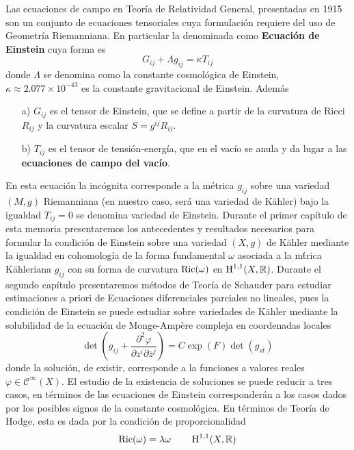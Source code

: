 Las ecuaciones de campo en Teor\'ia de Relatividad General, presentadas en 1915 son un conjunto de ecuaciones tensoriales cuya formulaci\'on requiere del uso de Geometr\'ia Riemanniana. En particular la denominada como \textbf{Ecuaci\'on de Einstein} cuya forma es
\[
	G_{ij} + \Lambda g_{ij} = \kappa T_{ij}
\]
donde $\Lambda$ se denomina como la constante cosmol\'ogica de Einstein, $\kappa \approx 2.077 \times 10^{-43}$ es la constante gravitacional de Einstein. Adem\'as
\begin{enumerate}
\item[a)] $G_{ij}$ es el tensor de Einstein, que se define a partir de la curvatura de Ricci $R_{ij}$ y la curvatura escalar $S = g^{ij}R_{ij}$.
\item[b)] $T_{ij}$ es el tensor de tensi\'on-energ\'ia, que en el vac\'io se anula y da lugar a las \textbf{ecuaciones de campo del vac\'io}.
\end{enumerate}
En esta ecuaci\'on la inc\'ognita corresponde a la m\'etrica $g_{ij}$ sobre una variedad $(M,g)$ Riemanniana (en nuestro caso, ser\'a una variedad de K\"ahler) bajo la igualdad $T_{ij}=0$ se denomina variedad de Einstein. Durante el primer cap\'itulo de esta memoria presentaremos los antecedentes y resultados necesarios para formular la condici\'on de Einstein sobre una variedad $(X,g)$ de K\"ahler mediante la igualdad en cohomolog\'ia de la forma fundamental $\omega$ asociada a la m\'trica K\"ahleriana $g_{ij}$ con su forma de curvatura $\operatorname{Ric} (\omega)$ en $\operatorname{H}^{1,1}(X, \mathbb{R})$. Durante el segundo cap\'itulo presentaremos m\'etodos de Teor\'ia de Schauder para estudiar estimaciones a priori de Ecuaciones diferenciales parciales no lineales, pues la condici\'on de Einstein se puede estudiar sobre variedades de K\"ahler mediante la solubilidad de la ecuaci\'on de Monge-Amp\`ere compleja en coordenadas locales
\begin{equation*}
\det \left( g_{ij} + \dfrac{\partial^2 \varphi}{\partial z^i \partial\overline{z}^j} \right) = C \exp(F) \det (g_{s\overline{t}})
\end{equation*}
donde la soluci\'on, de existir, corresponde a la funciones a valores reales $\varphi \in \mathcal{C}^\infty (X)$. El estudio de la existencia de soluciones se puede reducir a tres casos, en t\'erminos de las ecuaciones de Einstein corresponder\'an a los casos dados por los posibles signos de la constante cosmol\'ogica. En t\'erminos de Teor\'ia de Hodge, esta es dada por la condici\'on de proporcionalidad 
\[
\operatorname{Ric} (\omega) = \lambda\omega  \quad \quad \operatorname{H}^{1,1}(X,\mathbb{R})
\]
